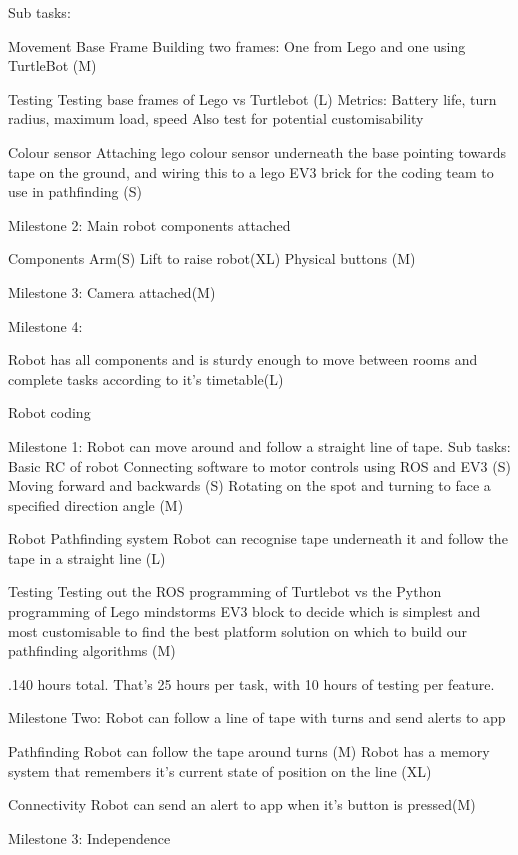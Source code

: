 \documentclass{article}
\begin{document}
Sub tasks:

Movement Base Frame
    Building two frames: One from Lego and one using TurtleBot (M)
    
Testing
    Testing base frames of Lego vs Turtlebot (L)
    Metrics: Battery life, turn radius, maximum load, speed
    Also test for potential customisability
    
Colour sensor
    Attaching lego colour sensor underneath the base pointing towards tape on the ground, and wiring this to a lego EV3 brick for the       coding team to use in pathfinding (S)
    
Milestone 2: Main robot components attached

Components
    Arm(S)
    Lift to raise robot(XL)
    Physical buttons (M)
    
Milestone 3: Camera attached(M)

Milestone 4:

Robot has all components and is sturdy enough to move between rooms and complete tasks according to it's timetable(L) 



Robot coding

Milestone 1: Robot can move around and follow a straight line of tape.
Sub tasks: 
Basic RC of robot
    Connecting software to motor controls using ROS and EV3 (S)
    Moving forward and backwards (S)
    Rotating on the spot and turning to face a specified direction angle (M)
    
Robot Pathfinding system
    Robot can recognise tape underneath it and follow the tape in a straight line (L)
    
Testing
    Testing out the ROS programming of Turtlebot vs the Python programming of Lego mindstorms EV3 block to decide which is simplest and     most customisable to find the best platform solution on which to build our pathfinding algorithms (M)
    
.140 hours total. That's 25 hours per task, with 10 hours of testing per feature.

Milestone Two: Robot can follow a line of tape with turns and send alerts to app 

Pathfinding
    Robot can follow the tape around turns (M)
    Robot has a memory system that remembers it's current state of position on the line (XL)
    
Connectivity    
    Robot can send an alert to app when it's button is pressed(M) 
    
Milestone 3: Independence
    
\end{document}
